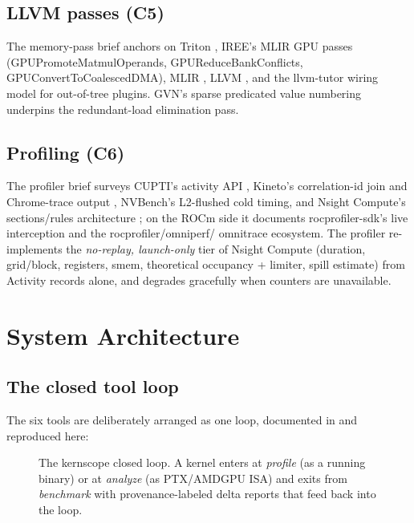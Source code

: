 \documentclass[10pt]{article}
\newcommand{\kst}[1]{\texttt{\detokenize{#1}}}
\begin{document}
\subsection{LLVM passes (C5)}

The memory-pass brief anchors on Triton \citep{triton2019}, IREE's MLIR GPU passes
\citep{iree} (GPUPromoteMatmulOperands, GPUReduceBankConflicts,
GPUConvertToCoalescedDMA), MLIR \citep{mlirCGO2021,mlirEndEra}, LLVM
\citep{llvm2004}, and the llvm-tutor \citep{llvmtutor} wiring model for out-of-tree
plugins. GVN's sparse predicated value numbering \citep{gargv2002} underpins the
redundant-load elimination pass.

\subsection{Profiling (C6)}

The profiler brief surveys CUPTI's activity API \citep{cupti}, Kineto's
correlation-id join and Chrome-trace output \citep{kineto}, NVBench's L2-flushed cold
timing, and Nsight Compute's sections/rules architecture \citep{nsightComputeSOL}; on the
ROCm side it documents rocprofiler-sdk's live interception and the rocprofiler/omniperf/
omnitrace ecosystem. The profiler re-implements the \emph{no-replay, launch-only} tier of
Nsight Compute (duration, grid/block, registers, smem, theoretical occupancy + limiter,
spill estimate) from Activity records alone, and degrades gracefully when counters are
unavailable.

\section{System Architecture}
\label{sec:arch}

\subsection{The closed tool loop}

The six tools are deliberately arranged as one loop, documented in
\kst{docs/architecture.md} and reproduced here:

\begin{figure}[ht]
  \centering
  \resizebox{\textwidth}{!}{}
  \caption{The kernscope closed loop. A kernel enters at \emph{profile} (as a running
  binary) or at \emph{analyze} (as PTX/AMDGPU ISA) and exits from \emph{benchmark} with
  provenance-labeled delta reports that feed back into the loop.}
  \label{fig:loop}
\end{figure}
\end{document}
